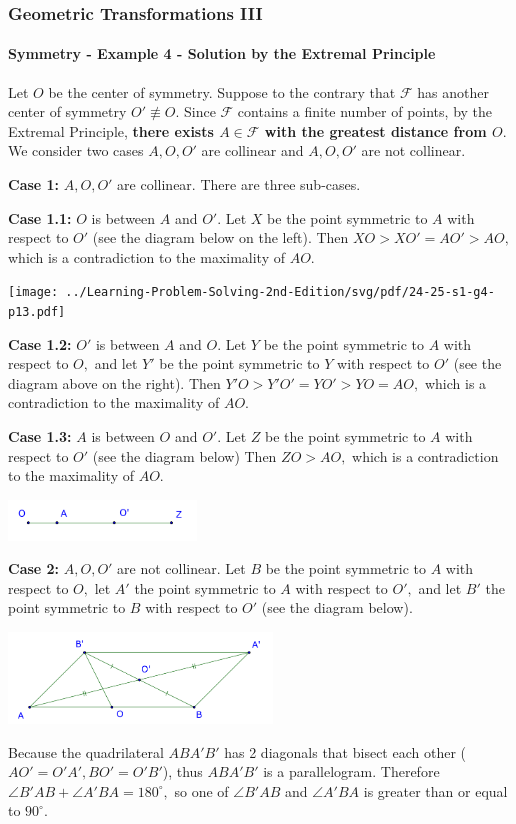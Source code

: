 \documentclass[8pt,xcolor=table,dvipsnames]{beamer}
\newcommand{\dg}{^\circ}
\begin{document}
\begin{frame}[t]
    \frametitle{Geometric Transformations III}
    \framesubtitle{Symmetry - Example 4 - Solution by the Extremal Principle}
    \begin{overprint}
        Let $O$ be the center of symmetry. Suppose to the contrary that $\mathcal{F}$ has another center of symmetry $O' \not \equiv O.$
        Since $\mathcal{F}$ contains a finite number of points, by the Extremal Principle,
        \textbf{there exists $A \in \mathcal{F}$ with the greatest distance from $O$}.
        We consider two cases $A, O, O'$ are collinear and $A, O, O'$ are not collinear.

        \textbf{Case 1:} $A, O, O'$ are collinear. There are three sub-cases.

        \textbf{Case 1.1:} $O$ is between $A$ and $O'.$ Let $X$ be the point symmetric to $A$ with respect to $O'$
        (see the diagram below on the left).
        Then $XO > XO' = AO' > AO,$ which is a contradiction to the maximality of $AO.$
        \begin{center}
            \texttt{[image: ../Learning-Problem-Solving-2nd-Edition/svg/pdf/24-25-s1-g4-p13.pdf]}
        \end{center}
        \textbf{Case 1.2:} $O'$ is between $A$ and $O.$ Let $Y$ be the point symmetric to $A$ with respect to $O,$
        and let $Y'$ be the point symmetric to $Y$ with respect to $O'$ (see the diagram above on the right).
        Then $Y'O > Y'O' = YO' > YO = AO,$ which is a contradiction to the maximality of $AO.$

        \textbf{Case 1.3:} $A$ is between $O$ and $O'.$ Let $Z$ be the point symmetric to $A$ with respect to $O'$
        (see the diagram below) Then $ZO > AO,$ which is a contradiction to the maximality of $AO.$
        \begin{center}
            \includegraphics[width=5cm]{./svg/pdf/24-25-s1-g4-p13-2.pdf}
        \end{center}
        \textbf{Case 2:} $A, O, O'$ are not collinear.
        Let $B$ be the point symmetric to $A$ with respect to $O,$ let $A'$ the point symmetric to $A$ with respect to $O',$
        and let $B'$ the point symmetric to $B$ with respect to $O'$ (see the diagram below).
        \begin{center}
            \includegraphics[width=7cm]{./svg/pdf/24-25-s1-g4-p13-3.pdf}
        \end{center}
        Because the quadrilateral $ABA'B'$ has 2 diagonals that bisect each other ($AO'=O'A', BO'=O'B'$), thus $ABA'B'$ is a parallelogram.
        Therefore $\angle B'AB + \angle A'BA = 180\dg,$ so one of $\angle B'AB$ and $\angle A'BA$ is greater than or equal to $90\dg.$
    

\end{overprint}
\end{frame}
\end{document}
